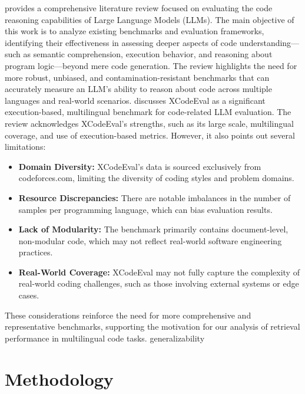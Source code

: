 \documentclass[12pt]{article}
\begin{document}
\cite{Dehghan2024} provides a comprehensive literature review focused on evaluating the code reasoning capabilities of Large Language Models (LLMs). The main objective of this work is to analyze existing benchmarks and evaluation frameworks, identifying their effectiveness in assessing deeper aspects of code understanding—such as semantic comprehension, execution behavior, and reasoning about program logic—beyond mere code generation. The review highlights the need for more robust, unbiased, and contamination-resistant benchmarks that can accurately measure an LLM's ability to reason about code across multiple languages and real-world scenarios. \cite{Dehghan2024} discusses XCodeEval as a significant execution-based, multilingual benchmark for code-related LLM evaluation. The review acknowledges XCodeEval's strengths, such as its large scale, multilingual coverage, and use of execution-based metrics. However, it also points out several limitations:
\begin{itemize}
    \item \textbf{Domain Diversity:} XCodeEval's data is sourced exclusively from codeforces.com, limiting the diversity of coding styles and problem domains.
    \item \textbf{Resource Discrepancies:} There are notable imbalances in the number of samples per programming language, which can bias evaluation results.
    \item \textbf{Lack of Modularity:} The benchmark primarily contains document-level, non-modular code, which may not reflect real-world software engineering practices.
    \item \textbf{Real-World Coverage:} XCodeEval may not fully capture the complexity of real-world coding challenges, such as those involving external systems or edge cases.
\end{itemize}

These considerations reinforce the need for more comprehensive and representative benchmarks, supporting the motivation for our analysis of retrieval performance in multilingual code tasks.
generalizability

\section{Methodology}



\end{document}

